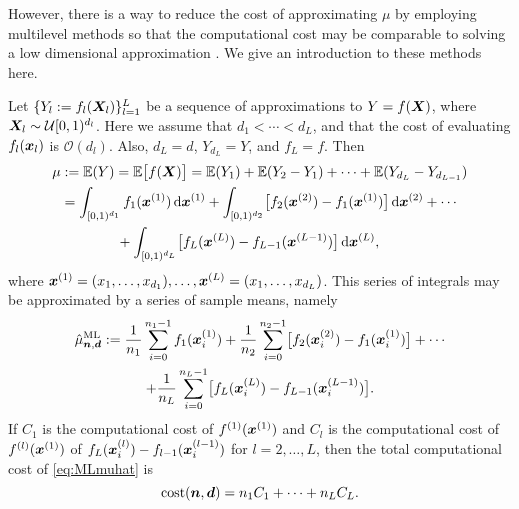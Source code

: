\documentclass{svproc}
\begin{document}
However, there is a way to reduce the cost of approximating $\mu$ by employing multilevel methods so that the computational cost may be comparable to solving a low dimensional approximation \cite{Gil15a}. We give an introduction to these methods here.

Let $\{Y_l := f_l({\boldsymbol{X}}_{l})\}_{l=1}^L$ be a sequence of approximations to $Y = f({\boldsymbol{X}})$, where ${\boldsymbol{X}}_l \sim \mathcal{U}[0,1)^{d_l}$.  Here we assume that $d_1 < \cdots < d_L$, and that the cost of evaluating $f_l({\boldsymbol{x}}_{l})$ is $\mathcal{O}(d_l)$.  Also, $d_L = d$, $Y_{d_L} = Y$, and $f_L = f$. Then
\begin{align*}
    \mu & := \mathbb{E}(Y) = \mathbb{E}\bigl[f({\boldsymbol{X}})\bigr]
    = \mathbb{E}(Y_1) + \mathbb{E}(Y_2 - Y_1) + \cdots + \mathbb{E}(Y_{d_L} - Y_{d_{L-1}}) \\
    & = \int_{[0,1)^{d_1}} f_1({\boldsymbol{x}}^{(1)}) \, \mathrm{d} {\boldsymbol{x}}^{(1)} +  \int_{[0,1)^{d_2}} \bigl[f_2({\boldsymbol{x}}^{(2)}) - f_1({\boldsymbol{x}}^{(1)})\bigr] \, \mathrm{d} {\boldsymbol{x}}^{(2)} + \cdots \\
    & \qquad \qquad + \int_{[0,1)^{d_L}} \bigl[f_L({\boldsymbol{x}}^{(L)}) - f_{L-1}({\boldsymbol{x}}^{(L-1)}) \bigr] \, \mathrm{d} {\boldsymbol{x}}^{(L)},
\end{align*}
where ${\boldsymbol{x}}^{(1)}  = (x_1, \dots, x_{d_1}), \ldots, {\boldsymbol{x}}^{(L)} = (x_1, \dots, x_{d_L})$.
This series of integrals may be approximated by a series of sample means, namely
\begin{multline} \label{eq:MLmuhat}
    \hat{\mu}^{\text{ML}}_{{\boldsymbol{n}},{\boldsymbol{d}}}  := \frac{1}{n_1}  \sum_{i=0}^{n_1-1} f_1({\boldsymbol{x}}^{(1)}_i)  +  \frac{1}{n_2}  \sum_{i=0}^{n_2-1}  \bigl[f_2({\boldsymbol{x}}^{(2)}_i) - f_1({\boldsymbol{x}}^{(1)}_i)\bigr] + \cdots \\
     + \frac{1}{n_L}  \sum_{i=0}^{n_L-1}  \bigl[f_L({\boldsymbol{x}}_i^{(L)}) - f_{L-1}({\boldsymbol{x}}_i^{(L-1)}) \bigr].
\end{multline}
If $C_1$ is the computational cost of $f^{(1)}({\boldsymbol{x}}^{(1)})$ and $C_l$ is the computational cost of $f^{(l)}({\boldsymbol{x}}^{(1)})$ of $f_L({\boldsymbol{x}}_i^{(l)}) - f_{l-1}({\boldsymbol{x}}_i^{(l-1)})$ for $l = 2, \ldots, L$, then the total computational cost of 
\eqref{eq:MLmuhat} is 
\begin{equation} \label{eq:MLcostdef}
    \text{cost}({\boldsymbol{n}},{\boldsymbol{d}}) = n_1 C_1 + \cdots + n_L C_L.
\end{equation}
\end{document}
